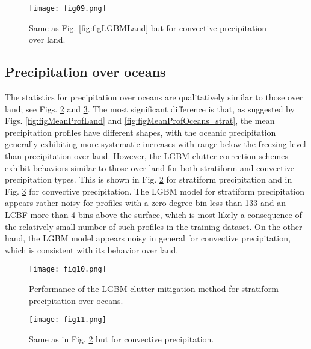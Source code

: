 \documentclass{ametsocV6.1} %
\begin{document}
\begin{center}
\begin{figure}
\texttt{[image: fig09.png]}
 \caption{Same as Fig. \ref{fig:figLGBMLand} but for convective precipitation over land.}
\label{fig:figLGBMLandConv}
\end{figure}
\end{center}

\subsection{Precipitation over oceans}

The statistics for precipitation over oceans are qualitatively similar to those over land; see Figs. \ref{fig:figMLStOceans} and \ref{fig:figMLConvOceans}. The most significant difference is that, as suggested by Figs. \ref{fig:figMeanProfLand} and \ref{fig:figMeanProfOceans_strat}, the mean precipitation profiles have different shapes, with the oceanic precipitation generally exhibiting more systematic increases with range below the freezing level than precipitation over land. However, the LGBM clutter correction schemes exhibit behaviors similar to those over land for both stratiform and convective precipitation types. This is shown in Fig. \ref{fig:figMLStOceans} for stratiform precipitation and in Fig. \ref{fig:figMLConvOceans} for convective precipitation. The LGBM model for stratiform precipitation appears rather noisy for profiles with a zero degree bin less than 133 and an LCBF more than 4 bins above the surface, which is most likely a consequence of the relatively small number of such profiles in the training dataset. On the other hand, the LGBM model appears noisy in general for convective precipitation, which is consistent with its behavior over land. 

\begin{center}
\begin{figure}
\texttt{[image: fig10.png]}\\
\caption{Performance of the LGBM clutter mitigation method for
 stratiform precipitation over oceans.}
\label{fig:figMLStOceans}
\end{figure}
\end{center}

\begin{center}
\begin{figure}
\texttt{[image: fig11.png]}\\
\caption{Same as in Fig. \ref{fig:figMLStOceans} but for convective precipitation.}
\label{fig:figMLConvOceans}
\end{figure}
\end{center}
\end{document}
